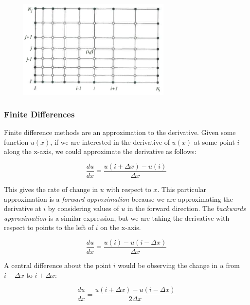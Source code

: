 \documentclass[twocolumn,12pth]{article}
\begin{document}
\begin{figure}
\centering
\includegraphics[width=3.0in]{numericalGrid.png}
\label{fig:grid}
\end{figure}

\subsubsection{Finite Differences}

Finite difference methods are an approximation to the derivative.
Given some function $u(x)$, if we are interested in the derivative of $u(x)$ at some point $i$ along the x-axis, we could approximate the derivative as follows:

\begin{equation}
\frac{du}{dx} = \frac{u(i + \Delta{x}) - u(i)}{\Delta{x}}
\label{eq:FD}
\end{equation}

This gives the rate of change in $u$ with respect to $x$.
This particular approximation is a \textit{forward approximation} because we are approximating the derivative at $i$ by considering values of $u$ in the forward direction.
The \textit{backwards approximation} is a similar expression, but we are taking the derivative with respect to points to the left of $i$ on the x-axis.

\begin{equation}
\frac{du}{dx} = \frac{u(i) - u(i - \Delta{x})}{\Delta{x}}
\label{eq:BD}
\end{equation}

A central difference about the point $i$ would be observing the change in $u$ from $i - \Delta{x}$ to $i + \Delta{x}$:

\begin{equation}
\frac{du}{dx} = \frac{u(i + \Delta{x}) - u(i - \Delta{x})}{2\Delta{x}}
\label{eq:CD}
\end{equation}
\end{document}
